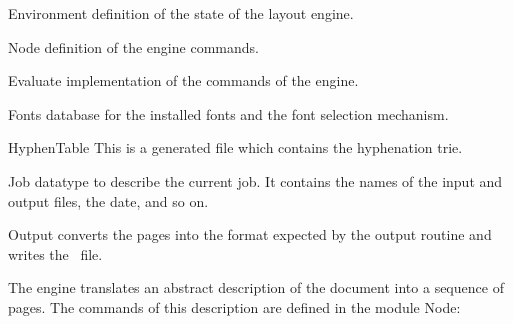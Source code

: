 \begin{description}
%
\item{\textsf{\red Environment}}%
  definition of the state of the layout engine.
\item{\textsf{\red Node}}%
  definition of the engine commands.
\item{\textsf{\red Evaluate}}%
  implementation of the commands of the engine.
\item{\textsf{\red Fonts}}%
  database for the installed fonts and the font selection mechanism.
\item{\textsf{\red HyphenTable}}%
  This is a generated file which contains the hyphenation trie.
\item{\textsf{\red Job}}%
  datatype to describe the current job. It contains the names of the input
  and output files, the date, and so on.
\item{\textsf{\red Output}}%
  converts the pages into the format expected by the output routine
  and writes the \dvi\ file.
\end{description}

The engine translates an abstract description of the document into a sequence of pages.
The commands of this description are defined in the module \textsf{\red Node}\?:

